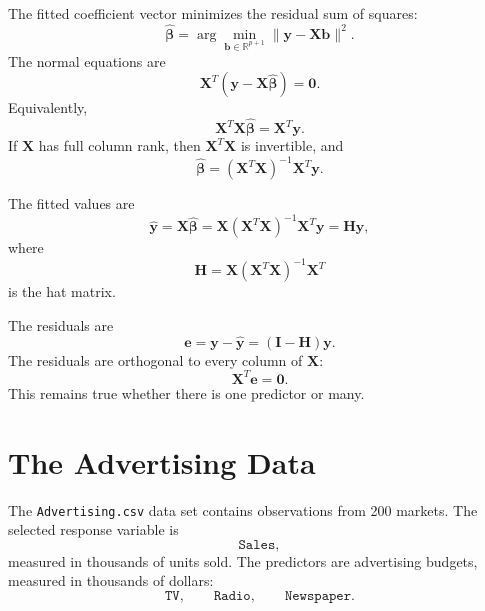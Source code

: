 The fitted coefficient vector minimizes the residual sum of squares:
\begin{equation}
  \widehat{\boldsymbol{\beta}}
  =\arg\min_{\mathbf{b}\in\mathbb{R}^{p+1}}\|\mathbf{y}-\mathbf{X}\mathbf{b}\|^2.
\end{equation}
The normal equations are
\begin{equation}
  \mathbf{X}^T\left(\mathbf{y}-\mathbf{X}\widehat{\boldsymbol{\beta}}\right)=\mathbf{0}.
\end{equation}
Equivalently,
\begin{equation}
  \mathbf{X}^T\mathbf{X}\widehat{\boldsymbol{\beta}}=\mathbf{X}^T\mathbf{y}.
\end{equation}
If \(\mathbf{X}\) has full column rank, then \(\mathbf{X}^T\mathbf{X}\) is invertible, and
\begin{equation}
  \boxed{\widehat{\boldsymbol{\beta}}
  =(\mathbf{X}^T\mathbf{X})^{-1}\mathbf{X}^T\mathbf{y}.}
\end{equation}

The fitted values are
\begin{equation}
  \widehat{\mathbf{y}}=\mathbf{X}\widehat{\boldsymbol{\beta}}
  =\mathbf{X}(\mathbf{X}^T\mathbf{X})^{-1}\mathbf{X}^T\mathbf{y}
  =\mathbf{H}\mathbf{y},
\end{equation}
where
\begin{equation}
  \mathbf{H}=\mathbf{X}(\mathbf{X}^T\mathbf{X})^{-1}\mathbf{X}^T
\end{equation}
is the hat matrix.

The residuals are
\begin{equation}
  \mathbf{e}=\mathbf{y}-\widehat{\mathbf{y}}=(\mathbf{I}-\mathbf{H})\mathbf{y}.
\end{equation}
The residuals are orthogonal to every column of \(\mathbf{X}\):
\begin{equation}
  \boxed{\mathbf{X}^T\mathbf{e}=\mathbf{0}.}
\end{equation}
This remains true whether there is one predictor or many.

\section{The Advertising Data}

The \texttt{Advertising.csv} data set contains observations from 200 markets.  The selected response variable is
\begin{equation}
  \texttt{Sales},
\end{equation}
measured in thousands of units sold.  The predictors are advertising budgets, measured in thousands of dollars:
\begin{equation}
  \texttt{TV},\qquad \texttt{Radio},\qquad \texttt{Newspaper}.
\end{equation}

